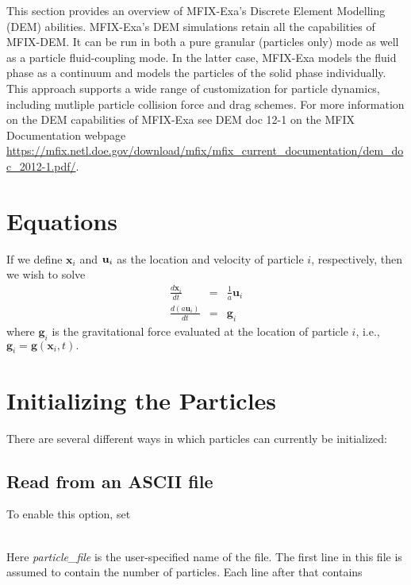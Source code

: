 This section provides an overview of MFIX-Exa's Discrete Element Modelling (DEM)
abilities. MFIX-Exa's DEM simulations retain all the capabilities of MFIX-DEM. 
It can be run in both a pure granular (particles only) mode  
as well as a particle fluid-coupling mode. In the latter case, MFIX-Exa models 
the fluid phase as a continuum and models the
particles of the solid phase individually. This approach supports a wide range 
of customization for particle dynamics, including mutliple particle collision 
force and drag schemes. For more information on the DEM capabilities of MFIX-Exa
see {\sf DEM doc 12-1} on the MFIX Documentation webpage 
{\url{https://mfix.netl.doe.gov/download/mfix/mfix_current_documentation/dem_doc_2012-1.pdf/}}.  


\section{Equations}

If we define ${\mathbf x}_i$ and ${\bf u}_i$ as the location and velocity of particle $i$, respectively, then we wish
to solve
\begin{eqnarray}
\frac{d {\mathbf x}_i}{d t} &=& \frac{1}{a} {\mathbf u}_i \\
\frac{d (a {\mathbf u}_i) }{d t} &=& {\mathbf g}_i
\end{eqnarray}
where ${\mathbf g}_i$ is the gravitational force evaluated at the location of particle $i$, i.e., 
${\mathbf g}_i = {\mathbf g}({\mathbf x}_i,t).$

\section{Initializing the Particles}

\noindent There are several different ways in which particles can currently be initialized:

\subsection{Read from an ASCII file}

To enable this option, set \\

 \\

Here {\em particle\_file} is the user-specified name of the file.  The first line in this file is
assumed to contain the number of particles.  Each line after that contains  \\

